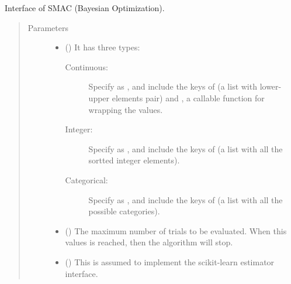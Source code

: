 \documentclass[letterpaper,10pt,english]{sphinxmanual}
\begin{document}
\begin{fulllineitems}
\label{\detokenize{apidoc:pybayopt.bayopt_smac.SMACOPT}}
Interface of SMAC (Bayesian Optimization).
\begin{quote}\begin{description}
\item[{Parameters}] \leavevmode\begin{itemize}
\item {} 
 () \textendash{} 
It has three types:
\begin{description}
\item[{Continuous: }] \leavevmode
Specify  as , and include the keys of  (a list with lower-upper elements pair) and
, a callable function for wrapping the values.

\item[{Integer:}] \leavevmode
Specify  as , and include the keys of  (a list with all the sortted integer elements).

\item[{Categorical:}] \leavevmode
Specify  as , and include the keys of  (a list with all the possible categories).

\end{description}


\item {} 
 (\sphinxstyleliteralemphasis{\sphinxupquote{, }}\sphinxstyleliteralemphasis{\sphinxupquote{, }}) \textendash{} The maximum number of trials to be evaluated. When this values is reached, 
then the algorithm will stop.

\item {} 
 () \textendash{} This is assumed to implement the scikit-learn estimator interface.


\end{itemize}
\end{description}
\end{quote}
\end{fulllineitems}
\end{document}
